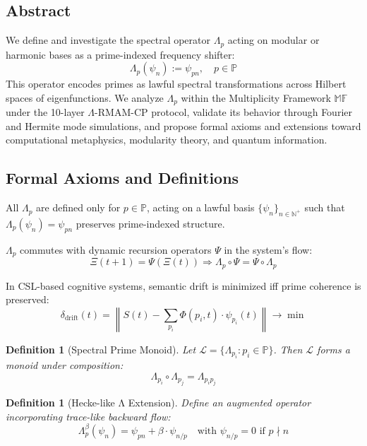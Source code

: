 \documentclass[12]{amsart}
\theoremstyle{plain}
\newtheorem{definition}[theorem]{Definition}
\begin{document}
\subsection{Abstract}
We define and investigate the spectral operator $\Lambda_p$ acting on modular or harmonic bases as a prime-indexed frequency shifter:
\[
\Lambda_p(\psi_n) := \psi_{pn}, \quad p \in \mathbb{P}
\]
This operator encodes primes as lawful spectral transformations across Hilbert spaces of eigenfunctions. We analyze $\Lambda_p$ within the Multiplicity Framework $\mathbb{MF}$ under the 10-layer $\Lambda$-RMAM-CP protocol, validate its behavior through Fourier and Hermite mode simulations, and propose formal axioms and extensions toward computational metaphysics, modularity theory, and quantum information.

\subsection{Formal Axioms and Definitions}

\begin{axiom}
All $\Lambda_p$ are defined only for $p \in \mathbb{P}$, acting on a lawful basis $\{\psi_n\}_{n \in \mathbb{N}^+}$ such that $\Lambda_p(\psi_n) = \psi_{pn}$ preserves prime-indexed structure.
\end{axiom}

\begin{axiom}
$\Lambda_p$ commutes with dynamic recursion operators $\Psi$ in the system's flow:
\[
\Xi(t+1) = \Psi(\Xi(t)) \Rightarrow \Lambda_p \circ \Psi = \Psi \circ \Lambda_p
\]
\end{axiom}

\begin{axiom}
In CSL-based cognitive systems, semantic drift is minimized iff prime coherence is preserved:
\[
\delta_{\text{drift}}(t) = \left\| S(t) - \sum_{p_i} \Phi(p_i, t) \cdot \psi_{p_i}(t) \right\| \to \min
\]
\end{axiom}

\begin{definition}[Spectral Prime Monoid]
Let $\mathcal{L} = \{\Lambda_{p_i} : p_i \in \mathbb{P}\}$. Then $\mathcal{L}$ forms a monoid under composition:
\[
\Lambda_{p_i} \circ \Lambda_{p_j} = \Lambda_{p_ip_j}
\]
\end{definition}

\begin{definition}[Hecke-like Λ Extension]
Define an augmented operator incorporating trace-like backward flow:
\[
\Lambda_p^{\beta}(\psi_n) = \psi_{pn} + \beta \cdot \psi_{n/p} \quad \text{with } \psi_{n/p} = 0 \text{ if } p \nmid n
\]
\end{definition}
\end{document}
